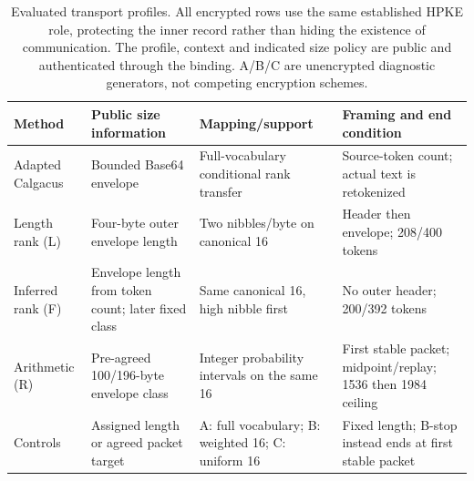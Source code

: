 \begin{table}[t]
\caption{Evaluated transport profiles. All encrypted rows use the same established HPKE role, protecting the inner record rather than hiding the existence of communication. The profile, context and indicated size policy are public and authenticated through the binding. A/B/C are unencrypted diagnostic generators, not competing encryption schemes.}
\label{tab:profiles}
\centering\small
\begin{tabular}{p{.80in}p{1.35in}p{1.65in}p{1.67in}}
\hline
Method & Public size information & Mapping/support & Framing and end condition\\
\hline
Adapted Calgacus & Bounded Base64 envelope & Full-vocabulary conditional rank transfer & Source-token count; actual text is retokenized\\
Length rank (L) & Four-byte outer envelope length & Two nibbles/byte on canonical 16 & Header then envelope; 208/400 tokens\\
Inferred rank (F) & Envelope length from token count; later fixed class & Same canonical 16, high nibble first & No outer header; 200/392 tokens\\
Arithmetic (R) & Pre-agreed 100/196-byte envelope class & Integer probability intervals on the same 16 & First stable packet; midpoint/replay; 1536 then 1984 ceiling\\
Controls & Assigned length or agreed packet target & A: full vocabulary; B: weighted 16; C: uniform 16 & Fixed length; B-stop instead ends at first stable packet\\
\hline
\end{tabular}
\end{table}
